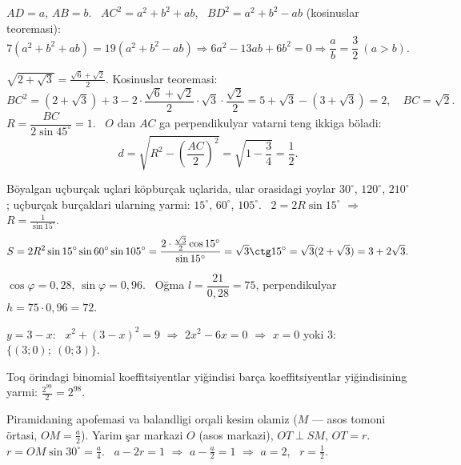 $AD=a$, $AB=b$. \ $AC^2=a^2+b^2+ab$, \ $BD^2=a^2+b^2-ab$ (kosinuslar teoremasi):
\[7(a^2+b^2+ab)=19(a^2+b^2-ab)\Rightarrow 6a^2-13ab+6b^2=0\Rightarrow \frac ab=\frac32\ \left(a>b\right).\]

$\sqrt{2+\sqrt3}=\frac{\sqrt6+\sqrt2}2$. Kosinuslar teoremasi:
\[BC^2=(2+\sqrt3)+3-2\cdot\frac{\sqrt6+\sqrt2}2\cdot\sqrt3\cdot\frac{\sqrt2}2=5+\sqrt3-(3+\sqrt3)=2,\quad BC=\sqrt2.\]
$R=\dfrac{BC}{2\sin45^\circ}=1$. \ $O$ dan $AC$ ga perpendikulyar vatarni teng ikkiga böladi:
\[d=\sqrt{R^2-\left(\frac{AC}2\right)^2}=\sqrt{1-\frac34}=\frac12.\]

Böyalgan uçburçak uçlari köpburçak uçlarida, ular orasidagi yoylar $30^\circ$, $120^\circ$, $210^\circ$; uçburçak burçaklari ularning yarmi: $15^\circ$, $60^\circ$, $105^\circ$. \ $2=2R\sin15^\circ$ $\Rightarrow$ $R=\frac1{\sin15^\circ}$.
\[S=2R^2\sin15^\circ\sin60^\circ\sin105^\circ=\frac{2\cdot\frac{\sqrt3}2\cos15^\circ}{\sin15^\circ}=\sqrt3\ctg15^\circ=\sqrt3(2+\sqrt3)=3+2\sqrt3.\]

$\cos\varphi=0{,}28$, $\sin\varphi=0{,}96$. \ Oğma $l=\dfrac{21}{0{,}28}=75$, perpendikulyar $h=75\cdot0{,}96=72$.

$y=3-x$: \ $x^2+(3-x)^2=9$ $\Rightarrow$ $2x^2-6x=0$ $\Rightarrow$ $x=0$ yoki $3$: \ $\{(3;0);\ (0;3)\}$.

Toq örindagi binomial koeffitsiyentlar yiğindisi barça koeffitsiyentlar yiğindisining yarmi: $\frac{2^{99}}2=2^{98}$.

\newpage
{}
Piramidaning apofemasi va balandligi orqali kesim olamiz ($M$ — asos tomoni örtasi, $OM=\frac a2$). Yarim şar markazi $O$ (asos markazi), $OT\perp SM$, $OT=r$.\\
$r=OM\sin30^\circ=\frac a4$. \ $a-2r=1$ $\Rightarrow$ $a-\frac a2=1$ $\Rightarrow$ $a=2$, \ $r=\frac12$.

